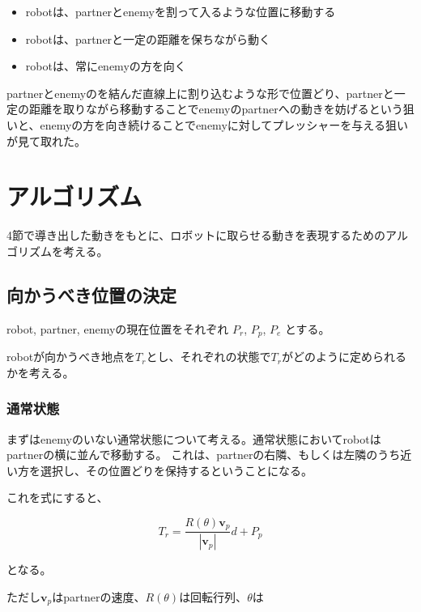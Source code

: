 \documentclass{kuisthesis}
\begin{document}
\begin{itemize}
\item robotは、partnerとenemyを割って入るような位置に移動する
\item robotは、partnerと一定の距離を保ちながら動く
\item robotは、常にenemyの方を向く
\end{itemize}

partnerとenemyのを結んだ直線上に割り込むような形で位置どり、partnerと一定の距離を取りながら移動することでenemyのpartnerへの動きを妨げるという狙いと、enemyの方を向き続けることでenemyに対してプレッシャーを与える狙いが見て取れた。






\section{アルゴリズム}

4節で導き出した動きをもとに、ロボットに取らせる動きを表現するためのアルゴリズムを考える。

\subsection{向かうべき位置の決定}

robot, partner, enemyの現在位置をそれぞれ $P_r$, $P_p$, $P_e$ とする。

robotが向かうべき地点を$T_r$とし、それぞれの状態で$T_r$がどのように定められるかを考える。

\subsubsection{通常状態}

まずはenemyのいない通常状態について考える。通常状態においてrobotはpartnerの横に並んで移動する。
これは、partnerの右隣、もしくは左隣のうち近い方を選択し、その位置どりを保持するということになる。

これを式にすると、

\begin{equation}
T_r = \frac{R(\theta)\bm{v}_p}{|\bm{v}_p|}d + P_p \nonumber
\end{equation}

となる。

ただし$\bm{v}_p$はpartnerの速度、$R(\theta)$は回転行列、$\theta$は
\end{document}
